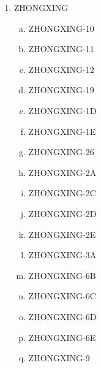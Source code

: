 \begin{multicols}{2}
\begin{enumerate}
\begin{enumerate}[a.]
  \end{enumerate}
  \item ZHONGXING
  \begin{enumerate}[a.]
    \item ZHONGXING-10
    \item ZHONGXING-11
    \item ZHONGXING-12
    \item ZHONGXING-19
    \item ZHONGXING-1D
    \item ZHONGXING-1E
    \item ZHONGXING-26
    \item ZHONGXING-2A
    \item ZHONGXING-2C
    \item ZHONGXING-2D
    \item ZHONGXING-2E
    \item ZHONGXING-3A
    \item ZHONGXING-6B
    \item ZHONGXING-6C
    \item ZHONGXING-6D
    \item ZHONGXING-6E
    \item ZHONGXING-9
  \end{enumerate}
\end{enumerate}
\end{multicols}
